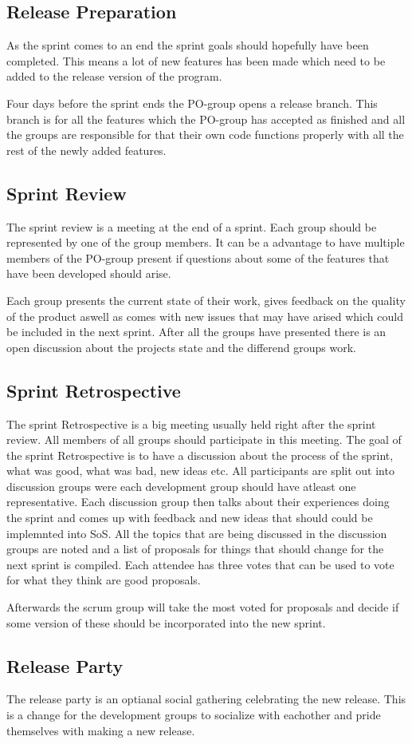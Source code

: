 \subsection{Release Preparation}
As the sprint comes to an end the sprint goals should hopefully have been completed.
This means a lot of new features has been made which need to be added to the release version of the program.

Four days before the sprint ends the PO-group opens a release branch.
This branch is for all the features which the PO-group has accepted as finished and all the groups are responsible for that their own code functions properly with all the rest of the newly added features.


\subsection{Sprint Review}

The sprint review is a meeting at the end of a sprint. 
Each group should be represented by one of the group members. 
It can be a advantage to have multiple members of the PO-group present if questions about some of the features that have been developed should arise.

Each group presents the current state of their work, gives feedback on the quality of the product aswell as comes with new issues that may have arised which could be included in the next sprint.
After all the groups have presented there is an open discussion about the projects state and the differend groups work.

\subsection{Sprint Retrospective}

The sprint Retrospective is a big meeting usually held right after the sprint review.
All members of all groups should participate in this meeting.
The goal of the sprint Retrospective is to have a discussion about the process of the sprint, what was good, what was bad, new ideas etc.
All participants are split out into discussion groups were each development group should have atleast one representative.
Each discussion group then talks about their experiences doing the sprint and comes up with feedback and new ideas that should could be implemnted into SoS.
All the topics that are being discussed in the discussion groups are noted and a list of proposals for things that should change for the next sprint is compiled.
Each attendee has three votes that can be used to vote for what they think are good proposals.

Afterwards the scrum group will take the most voted for proposals and decide if some version of these should be incorporated into the new sprint.

\subsection{Release Party}

The release party is an optianal social gathering celebrating the new release. 
This is a change for the development groups to socialize with eachother and pride themselves with making a new release.

